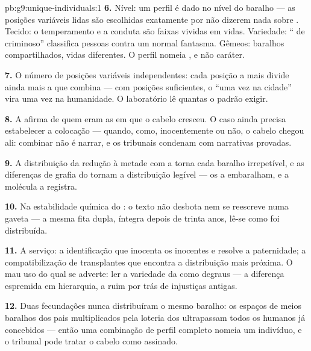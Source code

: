 \begin{solution}{pb:g9:unique-individuals:1}
\textbf{6.} Nível: um perfil é dado no nível do baralho ---
as posições variáveis lidas são escolhidas exatamente por não
dizerem nada sobre . Tecido: o temperamento e
a conduta são faixas vividas em vidas. Variedade: `` de
criminoso'' classifica pessoas contra um normal fantasma.
Gêmeos: baralhos compartilhados, vidas diferentes. O perfil
nomeia , e não caráter.

\textbf{7.} O número de posições variáveis independentes:
cada posição a mais divide ainda mais a  que combina
--- com posições suficientes, o ``uma vez na cidade'' vira
uma vez na humanidade. O laboratório lê quantas o padrão
exigir.

\textbf{8.} A  afirma de quem eram as  em que
o cabelo cresceu. O caso ainda precisa estabelecer a
colocação --- quando, como, inocentemente ou não, o cabelo
chegou ali: combinar não é narrar, e os tribunais condenam
com narrativas provadas.

\textbf{9.} A distribuição da redução à metade com a
 torna cada baralho irrepetível, e as diferenças de
grafia do  tornam a distribuição legível --- os
 a embaralham, e a molécula a registra.

\textbf{10.} Na estabilidade química do : o texto não
desbota nem se reescreve numa gaveta --- a mesma fita dupla,
íntegra depois de trinta anos, lê-se como foi distribuída.

\textbf{11.} A serviço: a identificação que inocenta os
inocentes e resolve a paternidade; a compatibilização de
transplantes que encontra a distribuição mais próxima. O mau
uso do qual se adverte: ler a variedade da  como
degraus --- a diferença espremida em hierarquia, a 
ruim por trás de injustiças antigas.

\textbf{12.} Duas fecundações nunca distribuíram o mesmo
baralho: os espaços de meios baralhos dos pais multiplicados
pela loteria dos  ultrapassam todos os humanos já
concebidos --- então uma combinação de perfil completo nomeia
um indivíduo, e o tribunal pode tratar o cabelo como
assinado.
\end{solution}
